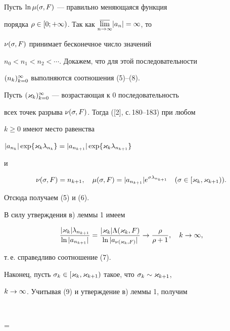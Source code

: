 \begin{pf}


Пусть $\ln\mu(\sigma,F)$ --- правильно меняющаяся функция 


порядка $\rho\in[0;+\infty)$. Так как $\underset{n\to\infty}\varlimsup{}|a_n|=\infty$, то 


$\nu(\sigma,F)$ принимает бесконечное число значений


$n_0<n_1<n_2<\dotsb$. Докажем, что для этой последовательности


$(n_k)_{k=0}^\infty$ выполняются соотношения (5)--(8).





Пусть $(\varkappa_k)_{k=0}^\infty$ --- возрастающая к $0$ последовательность


всех точек разрыва $\nu(\sigma,F)$. Тогда ([2], с.\,180--183) при любом


$k\ge 0$ имеют место равенства


$|a_{n_k}|\exp\{\varkappa_k\lambda_{n_k}\}=|a_{n_{k+1}}|\exp\{\varkappa_k\lambda_{n_{k+1}}\}$


и 


\begin{equation}


\nu(\s,F)=n_{k+1},\quad\mu(\s,F)=


|a_{n_{k+1}}|e^{\s\la_{n_{k+1}}}\quad(\s\in[\k_k,\k_{k+1})).


\end{equation}


Отсюда получаем (5) и (6). 





В силу утверждения в) леммы 1 имеем 


$$


\frac{|\k_k|\la_{n_{k+1}}}{\ln|a_{n_{k+1}}|}=


\frac{|\k_k|\L(\k_k,F)}{\ln|a_{\nu(\k_k,F)}|}


\to\frac{\r}{\r+1},\quad k\to\i,


$$


т.\,е. справедливо соотношение (7).





Наконец, пусть $\sigma_k\in[\varkappa_k,\varkappa_{k+1})$ такое, что $\sigma_k \sim \varkappa_{k+1}$,


$k\to\infty$. Учитывая (9) и утверждение в) леммы 1, получим


$$


=


\cdot



\end{pf}
